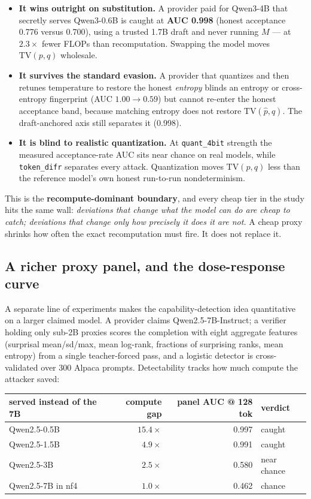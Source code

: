 \documentclass[11pt]{article}
\newcommand{\td}{\texttt{token\_difr}}
\begin{document}
\begin{itemize}
\item \textbf{It wins outright on substitution.} A provider paid for Qwen3-4B that
secretly serves Qwen3-0.6B is caught at \textbf{AUC 0.998} (honest acceptance 0.776
versus 0.700), using a trusted 1.7B draft and never running $M$ --- at $2.3\times$
fewer FLOPs than recomputation. Swapping the model moves $\mathrm{TV}(p,q)$
wholesale.
\item \textbf{It survives the standard evasion.} A provider that quantizes and then
retunes temperature to restore the honest \emph{entropy} blinds an entropy or
cross-entropy fingerprint (AUC $1.00 \to 0.59$) but cannot re-enter the honest
acceptance band, because matching entropy does not restore $\mathrm{TV}(\hat{p},q)$.
The draft-anchored axis still separates it (0.998).
\item \textbf{It is blind to realistic quantization.} At \texttt{quant\_4bit}
strength the measured acceptance-rate AUC sits near chance on real models, while
\td{} separates every attack. Quantization moves $\mathrm{TV}(p,q)$ less than the
reference model's own honest run-to-run nondeterminism.
\end{itemize}

\noindent This is the \textbf{recompute-dominant boundary}, and every cheap tier in
the study hits the same wall: \emph{deviations that change what the model can do are
cheap to catch; deviations that change only how precisely it does it are not.} A
cheap proxy shrinks how often the exact recomputation must fire. It does not replace
it.

\subsection{A richer proxy panel, and the dose-response curve}

A separate line of experiments makes the capability-detection idea quantitative on a
larger claimed model. A provider claims Qwen2.5-7B-Instruct; a verifier holding only
sub-2B proxies scores the completion with eight aggregate features (surprisal
mean/sd/max, mean log-rank, fractions of surprising ranks, mean entropy) from a single
teacher-forced pass, and a logistic detector is cross-validated over 300 Alpaca
prompts. Detectability tracks how much compute the attacker saved:

\begin{center}\small
\begin{tabular}{lrrl}
\toprule
served instead of the 7B & compute gap & panel AUC @ 128 tok & verdict \\
\midrule
Qwen2.5-0.5B & $15.4\times$ & 0.997 & caught \\
Qwen2.5-1.5B & $4.9\times$  & 0.991 & caught \\
Qwen2.5-3B   & $2.5\times$  & 0.580 & near chance \\
Qwen2.5-7B in nf4 & $1.0\times$ & 0.462 & chance \\
\bottomrule
\end{tabular}
\end{center}
\end{document}
